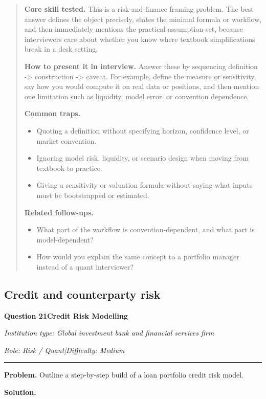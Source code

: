 \documentclass[11pt,letterpaper,openany]{book}
\newenvironment{EditorialNote}
  {\begin{quote}\small\setlength{\parskip}{0.25em}}
  {\end{quote}}
\newcommand{\QuestionSpacer}{\vspace{0.4em}}
\newcommand{\InterviewQuestionHeader}[5]{%
  \vspace{1.0em}%
  {\large\bfseries #1\enspace #4\par}%
  {\small\itshape Institution type: #2\par}%
  {\small\itshape Role: #3\enspace |\enspace Difficulty: #5\par}%
  \vspace{0.25em}\hrule\vspace{0.45em}%
}
\begin{document}
\begin{EditorialNote}


\textbf{Core skill tested.} This is a risk-and-finance framing problem. The best answer defines the object precisely, states the minimal formula or workflow, and then immediately mentions the practical assumption set, because interviewers care about whether you know where textbook simplifications break in a desk setting.

\textbf{How to present it in interview.} Answer these by sequencing definition -> construction -> caveat. For example, define the measure or sensitivity, say how you would compute it on real data or positions, and then mention one limitation such as liquidity, model error, or convention dependence.

\textbf{Common traps.}
\begin{itemize}
\item Quoting a definition without specifying horizon, confidence level, or market convention.
\item Ignoring model risk, liquidity, or scenario design when moving from textbook to practice.
\item Giving a sensitivity or valuation formula without saying what inputs must be bootstrapped or estimated.
\end{itemize}

\textbf{Related follow-ups.}
\begin{itemize}
\item What part of the workflow is convention-dependent, and what part is model-dependent?
\item How would you explain the same concept to a portfolio manager instead of a quant interviewer?
\end{itemize}


\end{EditorialNote}
\QuestionSpacer

\subsection{Credit and counterparty risk}

\InterviewQuestionHeader{Question 21}{Global investment bank and financial services firm}{Risk / Quant}{Credit Risk Modelling}{Medium}
\textbf{Problem.} Outline a step-by-step build of a loan portfolio credit risk model.

\textbf{Solution.}
\end{document}
